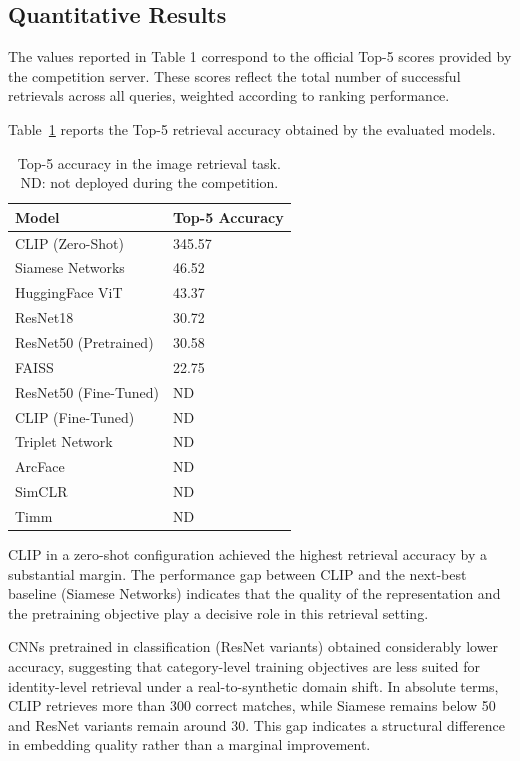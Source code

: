 \documentclass[10pt,twocolumn,letterpaper]{article}
\begin{document}
\subsection{Quantitative Results}
The values reported in Table 1 correspond to the official Top-5 scores provided by the competition server. These scores reflect the total number of successful retrievals across all queries, weighted according to ranking performance.

Table~\ref{tab:results} reports the Top-5 retrieval accuracy obtained by the evaluated models.

\begin{table}[ht]
\centering
\caption{Top-5 accuracy in the image retrieval task. ND: not deployed during the competition.}
\label{tab:results}
\begin{tabular}{ll}
\toprule
\textbf{Model} & \textbf{Top-5 Accuracy} \\
\midrule
CLIP (Zero-Shot) & 345.57 \\
Siamese Networks & 46.52 \\
HuggingFace ViT & 43.37 \\
ResNet18 & 30.72 \\
ResNet50 (Pretrained) & 30.58 \\
FAISS & 22.75 \\
ResNet50 (Fine-Tuned) & ND \\
CLIP (Fine-Tuned) & ND \\
Triplet Network & ND \\
ArcFace & ND \\
SimCLR & ND \\
Timm & ND \\
\bottomrule
\end{tabular}
\end{table}

CLIP in a zero-shot configuration achieved the highest retrieval accuracy by a substantial margin. The performance gap between CLIP and the next-best baseline (Siamese Networks) indicates that the quality of the representation and the pretraining objective play a decisive role in this retrieval setting.

CNNs pretrained in classification (ResNet variants) obtained considerably lower accuracy, suggesting that category-level training objectives are less suited for identity-level retrieval under a real-to-synthetic domain shift.
In absolute terms, CLIP retrieves more than 300 correct matches, while Siamese remains below 50 and ResNet variants remain around 30. This gap indicates a structural difference in embedding quality rather than a marginal improvement.
\end{document}
